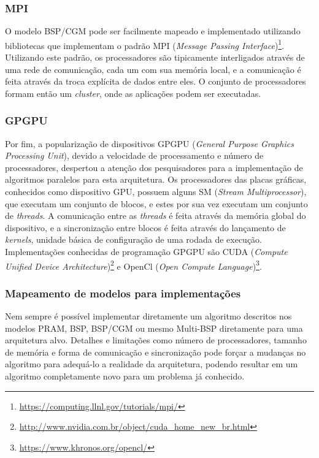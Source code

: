 \documentclass[a4paper, 12pt] {article}
\begin{document}
\subsubsection{MPI}

O modelo BSP/CGM pode ser facilmente mapeado e implementado utilizando
bibliotecas que implementam o padrão MPI (\textit{Message Passing
Interface})\footnote{\url{https://computing.llnl.gov/tutorials/mpi/}}.
Utilizando este padrão, os processadores são tipicamente interligados através de uma rede de
comunicação, cada um com sua memória local, e a comunicação é feita através da
troca explícita de dados entre eles. O conjunto de processadores formam então um
\textit{cluster}, onde as aplicações podem ser executadas.

\subsubsection{GPGPU}

Por fim, a popularização de dispositivos GPGPU (\textit{General Purpose Graphics
Processing Unit}), devido a velocidade de processamento e número de
processadores, despertou a atenção dos pesquisadores para a implementação de
algoritmos paralelos para esta arquitetura. Os processadores das placas gráficas, conhecidos como dispositivo GPU, possuem
alguns SM (\textit{Stream Multiprocessor}), que executam um conjunto de blocos, e estes
por sua vez executam um conjunto de \textit{threads}. A comunicação entre as
\textit{threads} é feita através da memória global do dispositivo, e a
sincronização entre blocos é feita através do lançamento de \textit{kernels},
unidade básica de configuração de uma rodada de execução. Implementações
conhecidas de programação GPGPU são CUDA (\textit{Compute Unified Device
Architecture})\footnote{\url{http://www.nvidia.com.br/object/cuda_home_new_br.html}}
e OpenCl (\textit{Open Compute
Language})\footnote{\url{https://www.khronos.org/opencl/}}.

\subsubsection{Mapeamento de modelos para implementações}

Nem sempre é possível implementar diretamente um algoritmo descritos nos modelos
PRAM, BSP, BSP/CGM ou mesmo Multi-BSP diretamente para uma arquitetura alvo.
Detalhes e limitações como número de processadores, tamanho de memória e forma
de comunicação e sincronização pode forçar a mudanças no algoritmo para
adequá-lo a realidade da arquitetura, podendo resultar em um algoritmo
completamente novo para um problema já conhecido.
\end{document}

